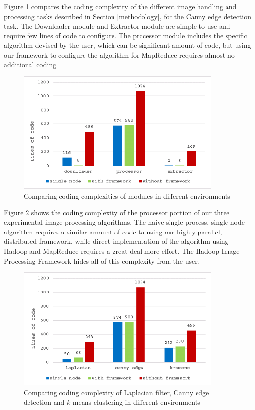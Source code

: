 \documentclass{osuthesis}
\begin{document}
				Figure \ref{fig:module-chart} compares the coding complexity of the
				different image handling and processing tasks described in Section
				\ref{methodology}, for the Canny edge detection task. The Downloader
				module and Extractor module are simple to use and require few lines of
				code to configure. The processor module includes the specific
				algorithm devised by the user, which can be significant amount of
				code, but using our framework to configure the algorithm for MapReduce
				requires almost no additional coding.
				
				\begin{figure}[h]
					\centering
					\includegraphics[width=0.90\textwidth]{module-chart2}
					\caption{Comparing coding complexities of modules in different
						environments}
					\label{fig:module-chart}
				\end{figure}
				
				Figure \ref{fig:comp-chart} shows the coding complexity of the
				processor portion of our three experimental image processing
				algorithms.  The naive single-process, single-node algorithm requires
				a similar amount of code to using our highly parallel, distributed
				framework, while direct implementation of the algorithm using Hadoop
				and MapReduce requires a great deal more effort.  The Hadoop Image
				Processing Framework hides all of this complexity from the user.
				
				\begin{figure}[h]
					\centering
					\includegraphics[width=0.90\textwidth]{comp-chart}
					\caption{Comparing coding complexity of Laplacian filter,
						Canny edge detection and $k$-means clustering in different
						environments}
					\label{fig:comp-chart}
				\end{figure}
				
\end{document}
